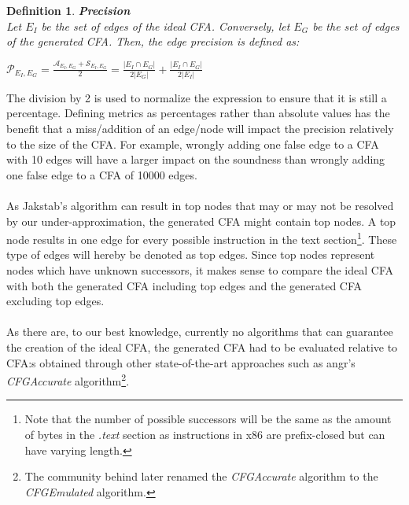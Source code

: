 \documentclass{kththesis}
\newtheorem*{definition}{Definition}
\renewcommand{\it}[1]{\textit{#1}}
\begin{document}
\begin{definition} \textbf{Precision}\\
Let $E_I$ be the set of edges of the ideal CFA. Conversely, let $E_G$ be the set of edges of the generated CFA. Then, the edge precision is defined as:
\begin{center}
$\mathcal{P}_{E_I,E_G} = \frac{\mathcal{A}_{E_I,E_G}+\mathcal{S}_{E_I,E_G}}{2} = \frac{|E_I \cap E_G|}{2|E_G|}+\frac{|E_I \cap E_G|}{2|E_I|}$
\end{center}
\end{definition}
\noindent
The division by 2 is used to normalize the expression to ensure that it is still a percentage. Defining metrics as percentages rather than absolute values has the benefit that a miss/addition of an edge/node will impact the precision relatively to the size of the CFA. For example, wrongly adding one false edge to a CFA with 10 edges will have a larger impact on the soundness than wrongly adding one false edge to a CFA of 10000 edges.
\\ \\
As Jakstab's algorithm can result in top nodes that may or may not be resolved by our under-approximation, the generated CFA might contain top nodes. A top node results in one edge for every possible instruction in the text section\footnote{Note that the number of possible successors will be the same as the amount of bytes in the \it{.text} section as instructions in x86 are prefix-closed but can have varying length.}. These type of edges will hereby be denoted as top edges. Since top nodes represent nodes which have unknown successors, it makes sense to compare the ideal CFA with both the generated CFA including top edges and the generated CFA excluding top edges. 
\\ \\
As there are, to our best knowledge, currently no algorithms that can guarantee the creation of the ideal CFA, the generated CFA had to be evaluated relative to CFA:s obtained through other state-of-the-art approaches such as angr's \textit{CFGAccurate} algorithm\cite{angr}\footnote{The community behind  later renamed the \textit{CFGAccurate} algorithm to the \textit{CFGEmulated} algorithm.}.
\end{document}
